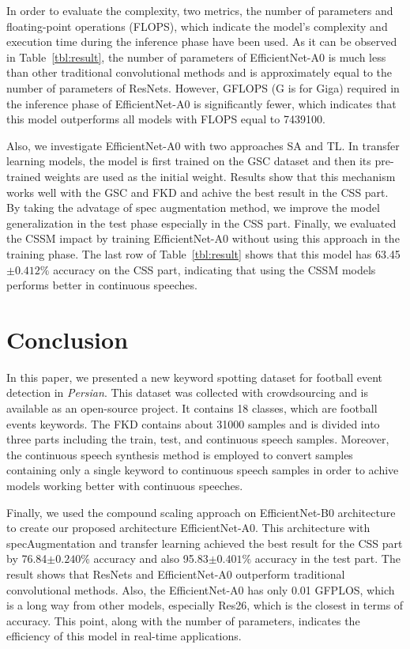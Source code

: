 \documentclass{article}
\begin{document}
In order to evaluate the complexity, two metrics, the number of parameters and floating-point operations (FLOPS), which indicate the model's complexity and execution time during the inference phase have been used\cite{flops}\cite{param}. As it can be observed in Table~\ref{tbl:result}, the number of parameters of EfficientNet-A0 is much less than other traditional convolutional methods and is approximately equal to the number of parameters of ResNets. However, GFLOPS (G is for Giga) required in the inference phase of EfficientNet-A0 is significantly fewer, which indicates that this model outperforms all models with FLOPS equal to 7439100.

Also, we investigate EfficientNet-A0 with two approaches SA and TL. In transfer learning models, the model is first trained on the GSC dataset and then its pre-trained weights are used as the initial weight. Results show that this mechanism works well with the GSC and FKD and achive the best result in the CSS part. By taking the advatage of spec augmentation method, we improve the model generalization in the test phase especially in the CSS part. Finally, we evaluated the CSSM impact by training EfficientNet-A0 without using this approach in the training phase. The last row of Table~\ref{tbl:result} shows that this model has 63.45$\pm{0.412}\%$ accuracy on the CSS part, indicating that using the CSSM models performs better in continuous speeches.

\section{Conclusion}
In this paper, we presented a new keyword spotting dataset for football event detection in \textit{Persian}. This dataset was collected with crowdsourcing and is available as an open-source project. It contains 18 classes, which are football events keywords. The FKD contains about 31000 samples and is divided into three parts including the train, test, and continuous speech samples. Moreover, the continuous speech synthesis method is employed to convert samples containing only a single keyword to continuous speech samples in order to achive models working better with continuous speeches.

Finally, we used the compound scaling approach on EfficientNet-B0 architecture to create our proposed architecture EfficientNet-A0. This architecture with specAugmentation and transfer learning achieved the best result for the CSS part by 76.84$\pm{0.240}\%$ accuracy and also 95.83$\pm{0.401}\%$ accuracy in the test part. The result shows that ResNets and EfficientNet-A0 outperform traditional convolutional methods. Also, the EfficientNet-A0 has only 0.01 GFPLOS, which is a long way from other models, especially Res26, which is the closest in terms of accuracy. This point, along with the number of parameters, indicates the efficiency of this model in real-time applications.

  
  
\end{document}
